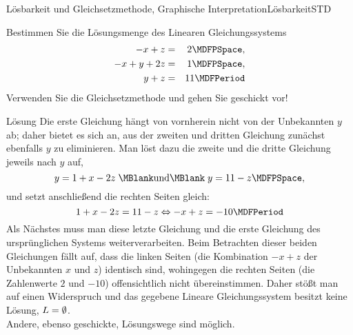 \begin{MXContent}{Lösbarkeit und Gleichsetzmethode, Graphische Interpretation}{Lösbarkeit}{STD}
\begin{MExercise}
Bestimmen Sie die Lösungsmenge des Linearen Gleichungssystems
\begin{eqnarray*}
- x + z & = & 2 \MDFPSpace, \\ - x + y + 2 z & = & 1 \MDFPSpace, \\ y + z & = & 11 \MDFPeriod
\end{eqnarray*}
Verwenden Sie die Gleichsetzmethode und gehen Sie geschickt vor!

\begin{MHint}{Lösung}
Die erste Gleichung hängt von vornherein nicht von der Unbekannten $y$ ab; daher bietet es sich an, aus der
zweiten und dritten Gleichung zunächst ebenfalls $y$ zu eliminieren. Man löst dazu die zweite und die dritte
Gleichung jeweils nach $y$ auf,
$$y = 1 + x - 2 z \; \MBlank\mbox{und}\MBlank \; y = 11 - z \MDFPSpace ,$$
und setzt anschließend die rechten Seiten gleich:
$$1 + x - 2 z = 11 - z \Leftrightarrow - x + z = - 10 \MDFPeriod $$
Als Nächstes muss man diese letzte Gleichung und die erste Gleichung des ursprünglichen Systems
weiterverarbeiten. Beim Betrachten dieser beiden Gleichungen fällt auf, dass die linken Seiten (die
Kombination $- x + z$ der Unbekannten $x$ und $z$) identisch sind, wohingegen die rechten Seiten
(die Zahlenwerte $2$ und $-10$) offensichtlich nicht übereinstimmen. Daher stößt man auf einen
Widerspruch und das gegebene Lineare Gleichungssystem besitzt keine Lösung, ${L} = \emptyset$.\\
Andere, ebenso geschickte, Lösungswege sind möglich.
\end{MHint}
\end{MExercise}
\end{MXContent}

